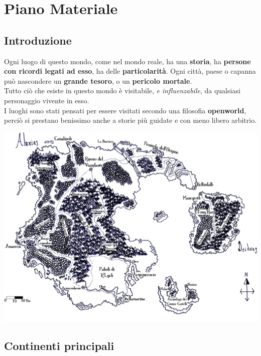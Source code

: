 \documentclass[10pt,twoside,onecolumn,openany]{book}
\begin{document}
\chapter{Piano Materiale}
\section{Introduzione}
Ogni luogo di questo mondo, come nel mondo reale, ha una \textbf{storia}, ha \textbf{persone con ricordi legati ad esso}, ha delle \textbf{particolarità}. Ogni città, paese o capanna può nascondere un \textbf{grande tesoro}, o un \textbf{pericolo mortale}. \\
Tutto ciò che esiste in questo mondo è visitabile, \emph{e influenzabile}, da qualsiasi personaggio vivente in esso. \\
I luoghi sono stati pensati per essere visitati secondo una filosofia \textbf{openworld}, perciò si prestano benissimo anche a storie più guidate e con meno libero arbitrio.\\
\begin{center}
\includegraphics[scale=0.75]{AluxiasDeidrastagged}
\end{center}
\newpage
\section{Continenti principali}
\end{document}
